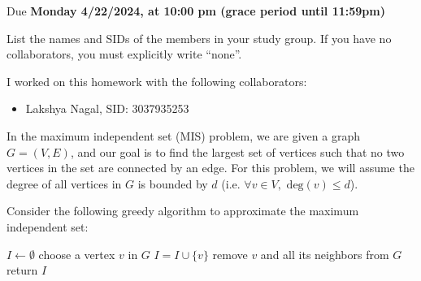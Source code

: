 \documentclass[11pt]{article}
\def\duedate{Monday 4/22/2024, at 10:00 pm (grace period until 11:59pm)}
\begin{document}
\maketitle


Due \textbf{\duedate}

List the names and SIDs of the members in your study group.
If you have no collaborators, you must explicitly write ``none''.

\begin{solution} I worked on this homework with the following collaborators:
\begin{itemize}
    \item Lakshya Nagal, SID: 3037935253
\end{itemize}
\end{solution}

\newpage


In the maximum independent set (MIS) problem, we are given a graph $G = (V, E)$, and our goal is to find the largest set of vertices such that no two vertices in the set are connected by an edge. For this problem, we will assume the degree of all vertices in $G$ is bounded by $d$ (i.e. $\forall v \in V, \text{ deg}(v) \leq d$).

Consider the following greedy algorithm to approximate the maximum independent set:

\begin{algorithm}
\begin{algorithmic}[1]
\State $I \gets \emptyset$
\State choose a vertex $v$ in $G$
\State $I = I \cup \{ v \}$
\State remove $v$ and all its neighbors from $G$
\EndWhile
\State return $I$
\EndProcedure
\end{algorithmic}
\end{algorithm}
\end{document}
